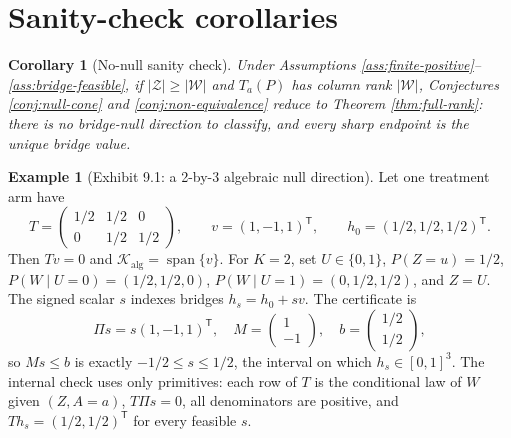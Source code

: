 \documentclass[11pt]{article}
\newcommand{\transpose}{\mathsf{T}}
\theoremstyle{definition}
\newtheorem{example}{Example}
\theoremstyle{plain}
\newtheorem{corollary}{Corollary}
\theoremstyle{remark}
\begin{document}
\section{Sanity-check corollaries}
\begin{corollary}[No-null sanity check]\label{cor:no-null}
Under Assumptions \ref{ass:finite-positive}--\ref{ass:bridge-feasible}, if \(|\mathcal Z|\ge|\mathcal W|\) and \(T_a(P)\) has column rank \(|\mathcal W|\), Conjectures \ref{conj:null-cone} and \ref{conj:non-equivalence} reduce to Theorem \ref{thm:full-rank}: there is no bridge-null direction to classify, and every sharp endpoint is the unique bridge value.
\end{corollary}

\begin{example}[Exhibit 9.1: a 2-by-3 algebraic null direction]\label{ex:small-witness}
Let one treatment arm have
\[
T=\begin{pmatrix}
1/2&1/2&0\\
0&1/2&1/2
\end{pmatrix},
\qquad
v=(1,-1,1)^\transpose,
\qquad
h_0=(1/2,1/2,1/2)^\transpose .
\]
Then \(Tv=0\) and \(\mathcal K_{\mathrm{alg}}=\operatorname{span}\{v\}\). For \(K=2\), set \(U\in\{0,1\}\), \(P(Z=u)=1/2\), \(P(W\mid U=0)=(1/2,1/2,0)\), \(P(W\mid U=1)=(0,1/2,1/2)\), and \(Z=U\). The signed scalar \(s\) indexes bridges \(h_s=h_0+s v\). The certificate is
\[
\Pi s=s(1,-1,1)^\transpose,
\quad
M=\begin{pmatrix}1\\-1\end{pmatrix},
\quad
b=\begin{pmatrix}1/2\\1/2\end{pmatrix},
\]
so \(M s\le b\) is exactly \(-1/2\le s\le1/2\), the interval on which \(h_s\in[0,1]^3\). The internal check uses only primitives: each row of \(T\) is the conditional law of \(W\) given \((Z,A=a)\), \(T\Pi s=0\), all denominators are positive, and \(T h_s=(1/2,1/2)^\transpose\) for every feasible \(s\).
\end{example}
\end{document}
